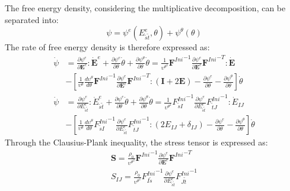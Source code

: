 \documentclass[oneside,11pt,times]{book}
\begin{document}
The free energy density, considering the multiplicative decomposition, can be separated into:
\begin{equation}
\psi = \psi^{e} ({{E}^{e}_{\tilde{s}\tilde{t}}}, \theta)+\psi^{\theta}(\theta)
\end{equation}
The rate of free energy density is therefore expressed as:
\begin{equation}
\begin{aligned}
\dot{\psi} &= \frac{\partial\psi^{e}}{\partial \boldsymbol{E}^e}:\boldsymbol{\dot{E}}^e+\frac{\partial\psi^{e}}{\partial \theta}\dot{\theta}+\frac{\partial\psi^{\theta}}{\partial \theta}\dot{\theta}=\frac{1}{{\upsilon^{\theta^2}}}{\bm{F}^{Ini}}^{-1}\frac{\partial\psi^{e}}{\partial \boldsymbol{E}^e}{\bm{F}^{Ini}}^{-T}:\boldsymbol{\dot{E}}\\
&-\left[\frac{1}{\upsilon^{\theta}}\frac{d\upsilon^{\theta}}{d\theta}{\bm{F}^{Ini}}^{-1}\frac{\partial\psi^{e}}{\partial \boldsymbol{E}^e}{\bm{F}^{Ini}}^{-T}:\left(\boldsymbol{I}+2\boldsymbol{E}\right)-\frac{\partial\psi^{e}}{\partial \theta}-\frac{\partial\psi^{\theta}}{\partial \theta} \right]\dot{\theta}\\
\dot{\psi} &= \frac{\partial\psi^{e}}{\partial {{E}^{e}_{\tilde{s}\tilde{t}}}}:{\dot{E}^{e}_{\tilde{s}\tilde{t}}}+\frac{\partial\psi^{e}}{\partial \theta}\dot{\theta}+\frac{\partial\psi^{\theta}}{\partial \theta}\dot{\theta}=\frac{1}{{\upsilon^{\theta^2}}}{{F}^{Ini}_{\tilde{s}I}}^{-1}\frac{\partial\psi^{e}}{\partial {{E}^{e}_{\tilde{s}\tilde{t}}}}{{F}^{Ini}_{\tilde{t}J}}^{-1}:\dot{E}_{IJ}\\&-\left[\frac{1}{\upsilon^{\theta}}\frac{d\upsilon^{\theta}}{d\theta}{{F}^{Ini}_{\tilde{s}I}}^{-1}\frac{\partial\psi^{e}}{\partial {{E}^{e}_{\tilde{s}\tilde{t}}}}{{F}^{Ini}_{\tilde{t}J}}^{-1}:\left(2{E}_{IJ}+\delta_{IJ}\right)-\frac{\partial\psi^{e}}{\partial \theta}-\frac{\partial\psi^{\theta}}{\partial \theta} \right]\dot{\theta}
\end{aligned}
\end{equation}
Through the Clausius-Plank inequality, the stress tensor is expressed as:
\begin{equation}
\begin{aligned}
\boldsymbol{S}=\frac{\rho_0}{{\upsilon^{\theta^2}}}{\bm{F}^{Ini}}^{-1}\frac{\partial\psi^{e}}{\partial \boldsymbol{E}^e}{\bm{F}^{Ini}}^{-T}\\
{S}_{IJ} =\frac{\rho_0}{{\upsilon^{\theta^2}}}{{F}^{Ini}_{I\tilde{s}}}^{-1}\frac{\partial\psi^{e}}{\partial {{E}^{e}_{\tilde{s}\tilde{t}}}}{{F}^{Ini}_{J\tilde{t}}}^{-1}
\end{aligned}
\label{stress2}
\end{equation}
\end{document}
